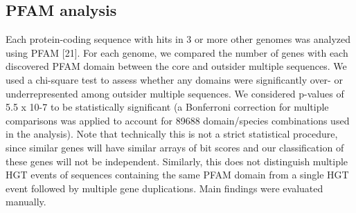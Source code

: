 \subsection{PFAM analysis}
Each protein-coding sequence with hits in 3 or more other genomes was analyzed using PFAM [21]. For each genome, we compared the number of genes with each discovered PFAM domain between the core and outsider multiple sequences. We used a chi-square test to assess whether any domains were significantly over- or underrepresented among outsider multiple sequences. We considered p-values of 5.5 x 10-7 to be statistically significant (a Bonferroni correction for multiple comparisons was applied to account for 89688 domain/species combinations used in the analysis). Note that technically this is not a strict statistical procedure, since similar genes will have similar arrays of bit scores and our classification of these genes will not be independent. Similarly, this does not distinguish multiple HGT events of sequences containing the same PFAM domain from a single HGT event followed by multiple gene duplications. Main findings were evaluated manually.
